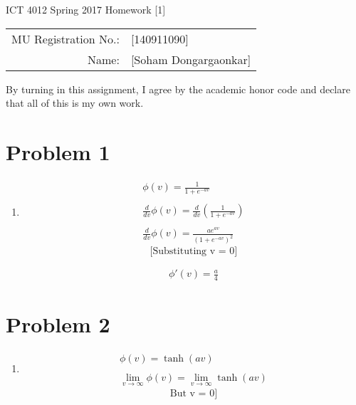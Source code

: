 \documentclass[12pt]{article}
\begin{document}
\begin{center}
{\Large ICT 4012 Spring 2017 Homework [1]} %

\begin{tabular}{rl}
MU Registration No.: & [140911090] \\  %
Name: & [Soham Dongargaonkar] \\   %
\end{tabular}
\end{center}

By turning in this assignment, I agree by the academic honor code and declare that all of this is my own work.

\section*{Problem 1}

\begin{enumerate}
    \item \begin{gather}
                \phi(v) =  \frac{1}{1+e^{-av}} \nonumber\\ \nonumber\\
                \frac{d}{dv}\phi(v) = \frac{d}{dv}(\frac{1}{1+e^{-av}})\nonumber\\\nonumber\\
                \frac{d}{dv}\phi(v) = \frac{ae^{av}}{(1+e^{-av})^2} \label{eqn:1}
            \end{gather}
            \[ 
                \text{[Substituting\ v = 0]} 
            \]
             
            \begin{gather}
                \phi'(v) = \frac{a}{4}
            \end{gather}  
               

   
\end{enumerate}

\section*{Problem 2}

\begin{enumerate}
  \item \begin{gather}
            \phi(v) = \tanh(av) \nonumber \\ \nonumber\\ 
            \lim_{v\to\infty} \phi(v) = \lim_{v\to\infty}\tanh(av) \label{eqn:2}
        \end{gather}
        \[ 
                \text{But\ v = 0]} 
        \]
\end{enumerate}
\end{document}

